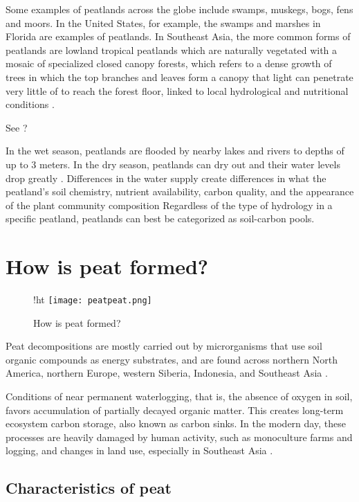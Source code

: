 Some examples of peatlands across the globe include swamps, muskegs, bogs, fens and moors. In the United States, for example, the swamps and marshes in Florida are examples of peatlands. In Southeast Asia, the more common forms of peatlands are lowland tropical peatlands which are naturally vegetated with a mosaic of specialized closed canopy forests, which refers to a dense growth of trees in which the top branches and leaves form a canopy that light can penetrate very little of to reach the forest floor, linked to local hydrological and nutritional conditions \citep{chokkalingam2005fire}.

See \citet{dennis2005fire}? 

In the wet season, peatlands are flooded by nearby lakes and rivers to depths of up to 3 meters. In the dry season, peatlands can dry out and their water levels drop greatly \citep{chokkalingam2005fire}. Differences in the water supply create differences in what the peatland's soil chemistry, nutrient availability, carbon quality, and the appearance of the plant community composition  Regardless of the type of hydrology in a specific peatland, peatlands can best be categorized as soil-carbon pools. 

\section{How is peat formed?}

\begin{figure}{!ht}
\texttt{[image: peatpeat.png]}
  \caption{How is peat formed?}
  \label{fig:peatformation}
\end{figure}

Peat decompositions are mostly carried out by microrganisms that use soil organic compounds as energy substrates, and are found across northern North America, northern Europe, western Siberia, Indonesia, and Southeast Asia \citep{rezanezhad2016structure}.

Conditions of near permanent waterlogging, that is, the absence of oxygen in soil, favors accumulation of partially decayed organic matter. This creates long-term ecosystem carbon storage, also known as carbon sinks. In the modern day, these processes are heavily damaged by human activity, such as monoculture farms and logging, and changes in land use, especially in Southeast Asia \citep{page2016line}.

\subsection{Characteristics of peat}

